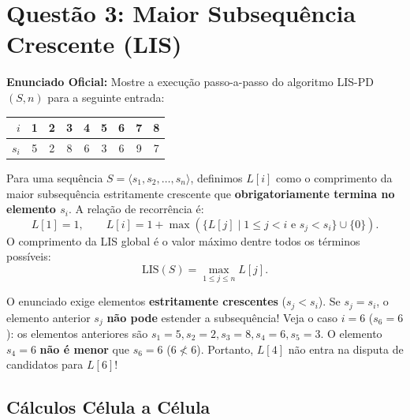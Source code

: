 \documentclass[11pt,a4paper]{article}
\begin{document}
\vspace{0.4cm}

\section*{Questão 3: Maior Subsequência Crescente (LIS)}

\textbf{Enunciado Oficial:} Mostre a execução passo-a-passo do algoritmo \textsc{LIS-PD}$(S, n)$ para a seguinte entrada:
\begin{center}
\begin{tabular}{r|cccccccc}
\toprule
$i$ & 1 & 2 & 3 & 4 & 5 & 6 & 7 & 8 \\
\midrule
$s_i$ & 5 & 2 & 8 & 6 & 3 & 6 & 9 & 7 \\
\bottomrule
\end{tabular}
\end{center}

\begin{teoria}
Para uma sequência $S = \langle s_1, s_2, \dots, s_n \rangle$, definimos $L[i]$ como o comprimento da maior subsequência estritamente crescente que \textbf{obrigatoriamente termina no elemento $s_i$}.
A relação de recorrência é:
\[
L[1] = 1, \qquad L[i] = 1 + \max \left( \{ L[j] \mid 1 \le j < i \text{ e } s_j < s_i \} \cup \{0\} \right).
\]
O comprimento da LIS global é o valor máximo dentre todos os términos possíveis:
\[
\text{LIS}(S) = \max_{1 \le j \le n} L[j].
\]
\end{teoria}

\begin{alerta}
O enunciado exige elementos \textbf{estritamente crescentes} ($s_j < s_i$). Se $s_j = s_i$, o elemento anterior $s_j$ \textbf{não pode} estender a subsequência!
Veja o caso $i = 6$ ($s_6 = 6$): os elementos anteriores são $s_1=5, s_2=2, s_3=8, s_4=6, s_5=3$. O elemento $s_4 = 6$ \textbf{não é menor} que $s_6 = 6$ ($6 \not< 6$). Portanto, $L[4]$ não entra na disputa de candidatos para $L[6]$!
\end{alerta}

\subsection*{Cálculos Célula a Célula}
\end{document}
